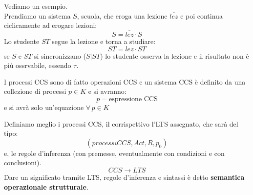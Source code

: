 \begin{esempio}
  Vediamo un esempio.\\
  Prendiamo un sistema $S$, scuola, che eroga una lezione $\overline{lez}$ e poi
  continua ciclicamente ad erogare lezioni:
  \[S=\overline{lez}\cdot S\]
  Lo studente $ST$ segue la lezione e torna a studiare:
  \[ST=lez\cdot ST\] 
  se $S$ e $ST$ si sincronizzano ($S|ST$) lo studente osserva la lezione e il
  risultato non è più ossrvabile, essendo $\tau$.
\end{esempio}
\begin{definizione}
  I processi CCS sono di fatto operazioni CCS e un sistema CCS è definito da una
  collezione di processi $p\in K$ e si avranno:
  \[p=\mbox{espressione CCS}\]
  e si avrà solo un'equazione $\forall\, p\in K$
\end{definizione} \vspace{5mm} %

Definiamo meglio i processi CCS, il corrispettivo l'LTS assegnato, che sarà
del tipo:
\[(processiCCS, Act, R, p_0)\]
e, le regole d'inferenza (con premesse, eventualmente con condizioni
e con conclusioni).\\
\[CCS\to LTS\]
Dare un significato tramite LTS, regole d'inferenza e sintassi è detto
\textbf{semantica operazionale strutturale}.\\
